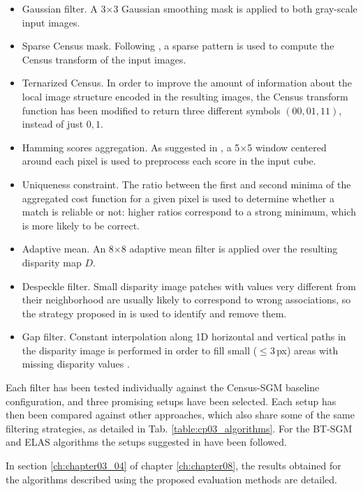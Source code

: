 \begin{itemize}
\item Gaussian filter. A 3$\times$3 Gaussian smoothing mask is applied to both gray-scale input images.
\item Sparse Census mask. Following \cite{Pantilie2012}, a sparse pattern is used to compute the Census transform of the input images.
\item Ternarized Census. In order to improve the amount of information about the local image structure encoded in the resulting images, the Census transform function has been modified to return three different symbols $(00, 01, 11)$, instead of just $0, 1$.
\item Hamming scores aggregation. As suggested in \cite{Pantilie2012}, a 5$\times$5 window centered around each pixel is used to preprocess each score in the input cube.
\item Uniqueness constraint. The ratio between the first and second minima of the aggregated cost function for a given pixel is used to determine whether a match is reliable or not: higher ratios correspond to a strong minimum, which is more likely to be correct.
\item Adaptive mean. An 8$\times$8 adaptive mean filter \citep{Geiger2011} is applied over the resulting disparity map $D$.
\item Despeckle filter. Small disparity image patches with values very different from their neighborhood are usually likely to correspond to wrong associations, so the strategy proposed in \cite{Hirschmuller2008} is used to identify and remove them.
\item Gap filter. Constant interpolation along 1D horizontal and vertical paths in the disparity image is performed in order to fill small ($\leq 3$\,px) areas with missing disparity values \citep{Geiger2011}.
\end{itemize}

Each filter has been tested individually against the Census-SGM baseline configuration, and three promising setups have been selected. Each setup has then been compared against other approaches, which also share some of the same filtering strategies, as detailed in Tab. \ref{table:cp03_algorithms}. For the BT-SGM and ELAS algorithms the setups suggested in \cite{Geiger2012} have been followed.

In section \ref{ch:chapter03_04} of chapter \ref{ch:chapter08}, the results obtained for the algorithms described using the proposed evaluation methods are detailed.

